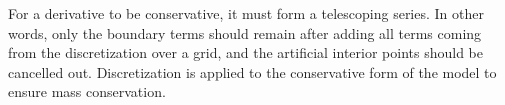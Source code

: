 \documentclass[../Article_Model_Parameters.tex]{subfiles}
\begin{document}
			For a derivative to be conservative, it must form a telescoping series. In other words, only the boundary terms should remain after adding all terms coming from the discretization over a grid, and the artificial interior points should be cancelled out. Discretization is applied to the conservative form of the model to ensure mass conservation.
			
		
\end{document}
